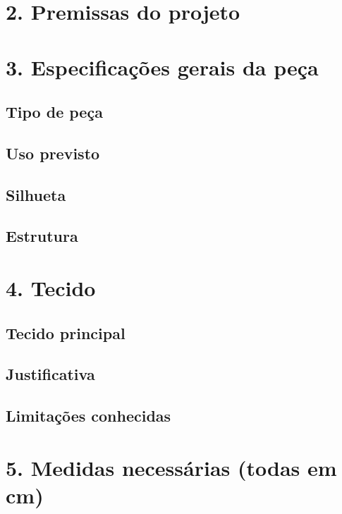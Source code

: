 \documentclass[
  brazilian,
  8pt,
  oneside]{book}
\begin{document}
\section{2. Premissas do projeto}\label{premissas-do-projeto}

\section{3. Especificações gerais da peça}\label{especificauxe7uxf5es-gerais-da-peuxe7a}

\subsection{Tipo de peça}\label{tipo-de-peuxe7a}

\subsection{Uso previsto}\label{uso-previsto}

\subsection{Silhueta}\label{silhueta}

\subsection{Estrutura}\label{estrutura}

\section{4. Tecido}\label{tecido}

\subsection{Tecido principal}\label{tecido-principal}

\subsection{Justificativa}\label{justificativa}

\subsection{Limitações conhecidas}\label{limitauxe7uxf5es-conhecidas}

\section{5. Medidas necessárias (todas em cm)}\label{medidas-necessuxe1rias-todas-em-cm}
\end{document}
